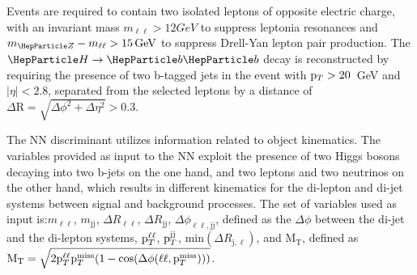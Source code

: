 Events are required to contain two isolated leptons of opposite electric charge, with an invariant mass $m_{\ell\ell} > 12
GeV$ to suppress leptonia resonances and $m_{\PZ} - m_{\ell\ell} > 15\GeV$ to suppress Drell-Yan lepton pair production.
The $\PH\to\PQb\PQb$ decay is reconstructed by requiring the presence of two b-tagged jets in the event with $\mathrm{p}_{T} > 20$~GeV and $| \eta | < 2.8$, separated from the selected leptons by a distance of $\Delta \text{R} = \sqrt{\Delta \phi^2 + \Delta \eta^2} > 0.3$.




The NN discriminant utilizes information related
to object kinematics.
The variables provided as input to the NN exploit the presence of two Higgs  bosons decaying into two b-jets on the one hand, and two leptons and two neutrinos on the other hand, 
which results in different kinematics for the di-lepton and di-jet systems between signal and 
background processes.
The set of variables used as input is:$ m_{\ell\ell}$, $m_\text{jj}$,
$\Delta R_{\ell\ell}$, $\Delta R_{\text{j}\text{j}}$, $\Delta \phi_{\ell\ell, \text{j}\text{j}}$, defined as 
the $\Delta \phi$ between the di-jet and the di-lepton systems, $\mathrm{p}_{T}^{\ell\ell}$, $\mathrm{p}_{T}^{\text{j}\text{j}}$,
min$\left(\Delta R_{\text{j}, \ell}\right)$, and $\mathrm{M}_\mathrm{T}$, defined as
$\mathrm{M}_\mathrm{T} = \sqrt{2 \mathrm{p}_{T}^{\ell\ell} \mathrm{p}_{T}^\text{miss} (1 - \cos(\Delta \phi(\ell\ell, \mathrm{p}_{T}^\text{miss})))}$.

